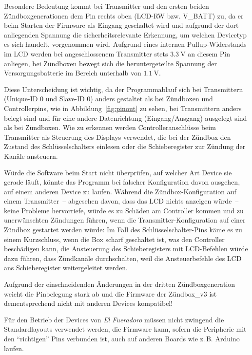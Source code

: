\documentclass[paper=a4, parskip, numbers=noenddot, toc=listof, headsepline]{scrbook}
\newcommand{\anlage}{\emph{El Fueradoro}}
\begin{document}
			Besondere Bedeutung kommt bei Transmitter und den ersten beiden Zündboxgenerationen dem Pin rechts oben (LCD-RW bzw. V\_BATT) zu, da er beim Starten der Firmware als Eingang geschaltet wird und aufgrund der dort anliegenden Spannung die sicherheitsrelevante Erkennung, um welchen Devicetyp es sich handelt, vorgenommen wird. Aufgrund eines internen Pullup-Widerstands im LCD werden bei angeschlossenem Transmitter stets $\SI{3,3}{\volt}$ an diesem Pin anliegen, bei Zündboxen bewegt sich die heruntergeteilte Spannung der Versorgungsbatterie im Bereich unterhalb von $\SI{1,1}{\volt}$.

			Diese Unterscheidung ist wichtig, da der Programmablauf sich bei Transmittern (Unique-ID 0 und Slave-ID 0) anders gestaltet als bei Zündboxen und Controllerpins, wie in Abbildung~\ref{fig:pinout} zu sehen, bei Transmittern anders belegt sind und für eine andere Datenrichtung (Eingang/Ausgang) ausgelegt sind als bei Zündboxen.  Wie zu erkennen werden Controlleranschlüsse beim Transmitter als Steuerung des Displays verwendet, die bei der Zündbox den Zustand des Schlüsselschalters einlesen oder die Schieberegister zur Zündung der Kanäle ansteuern.

			Würde die Software beim Start nicht überprüfen, auf welcher Art Device sie gerade läuft, könnte das Programm bei falscher Konfiguration davon ausgehen, auf einem anderen Device zu laufen. Während die Zündbox-Konfiguration auf einem Transmitter~-- abgesehen davon, dass das LCD nichts anzeigen würde~-- keine Probleme hervorriefe, würde es zu Schäden am Controller kommen und zu unerwünschten Zündungen führen, wenn die Transmitter-Konfiguration auf einer Zündbox gestartet werden würde: Im Fall des Schlüsselschalter-Pins käme es  zu einem Kurzschluss, wenn die Box scharf geschaltet ist, was den Controller beschädigen kann, die Ansteuerung des Schieberegisters mit LCD-Befehlen würde dazu führen, dass Zündkanäle durchschalten, weil die Ansteuerbefehle des LCD ans Schieberegister weitergeleitet werden.

			Aufgrund der einschneidenden Änderungen in der dritten Zündboxgeneration weicht die Pinbelegung stark ab und die Firmware der Zündbox\_v3 ist dementsprechend nicht mit anderen Devices kompatibel!

			Für den Betrieb der Devices von {\anlage} müssen nicht zwingend die Standardlayouts verwendet werden, die Firmware kann, sofern die Peripherie mit den \enquote{richtigen} Pins verbunden ist, auch auf anderen Boards wie z.\,B. Arduino laufen.
\end{document}
